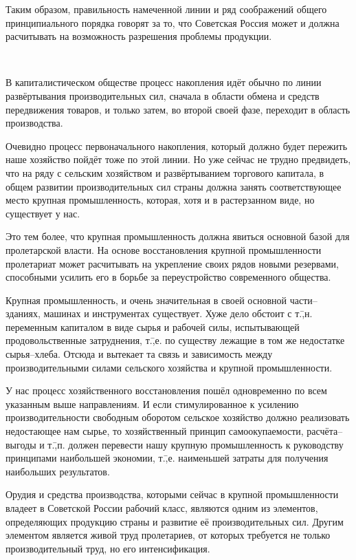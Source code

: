 Таким образом, правильность намеченной линии и ряд соображений общего принципиального порядка говорят за то, что Советская Россия может и должна расчитывать на возможность разрешения проблемы продукции.

\begin{center}
 \noindent\textasteriskcentered\ \textasteriskcentered\ \textasteriskcentered
\end{center}

В капиталистическом обществе процесс накопления идёт обычно по линии развёртывания производительных сил, сначала в области обмена и средств передвижения товаров, и только затем, во второй своей фазе, переходит в область производства.

Очевидно процесс первоначального накопления, который должно будет пережить наше хозяйство пойдёт тоже по этой линии. Но уже сейчас не трудно предвидеть, что на ряду с сельским хозяйством и развёртыванием торгового капитала, в общем развитии производительных сил страны должна занять соответствующее место крупная промышленность, которая, хотя и в растерзанном виде, но существует у нас.

Это тем более, что крупная промышленность должна явиться основной базой для пролетарской власти. На основе восстановления крупной промышленности пролетариат может расчитывать на укрепление своих рядов новыми резервами, способными усилить его в борьбе за переустройство современного общества.

Крупная промышленность, и очень значительная в своей основной части\---зданиях, машинах и инструментах существует. Хуже дело обстоит с т.\=,н. переменным капиталом в виде сырья и рабочей силы, испытывающей продовольственные затруднения, т.\=,е. по существу лежащие в том же недостатке сырья\---хлеба. Отсюда и вытекает та связь и зависимость между производительными силами сельского хозяйства и крупной промышленности.

У нас процесс хозяйственного восстановления пошёл одновременно по всем указанным выше направлениям. И если стимулированное к усилению производительности свободным оборотом сельское хозяйство должно реализовать недостающее нам сырье, то хозяйственный принцип самоокупаемости, расчёта\--- выгоды и т.\=,п. должен перевести нашу крупную промышленность к руководству принципами наибольшей экономии, т.\=,е. наименьшей затраты для получения наибольших результатов.

Орудия и средства производства, которыми сейчас в крупной промышленности владеет в Советской России рабочий класс, являются одним из элементов, определяющих продукцию страны и развитие её производительных сил. Другим элементом является живой труд пролетариев, от которых требуется не только производительный труд, но его интенсификация.

